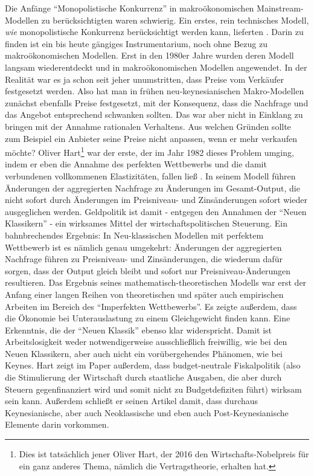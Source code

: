 Die Anfänge "`Monopolistische Konkurrenz"' in makroökonomischen Mainstream-Modellen zu berücksichtigten waren schwierig. Ein erstes, rein technisches Modell, \textit{wie} monopolistische Konkurrenz berücksichtigt werden kann, lieferten \textcite{Dixit1977}. Darin zu finden ist ein bis heute gängiges Instrumentarium, noch ohne Bezug zu makroökonomischen Modellen. Erst in den 1980er Jahre wurden deren Modell langsam wiederentdeckt und in makroökonomischen Modellen angewendet. In der Realität war es ja schon seit jeher unumstritten, dass Preise vom Verkäufer festgesetzt werden. Also hat man in frühen neu-keynesianischen Makro-Modellen \parencite[S. 97]{Hart1982} zunächst ebenfalls Preise festgesetzt, mit der Konsequenz, dass die Nachfrage und das Angebot entsprechend schwanken sollten. Das war aber nicht in Einklang zu bringen mit der Annahme rationalen Verhaltens. Aus welchen Gründen sollte zum Beispiel ein Anbieter seine Preise nicht anpassen, wenn er mehr verkaufen möchte? Oliver Hart\footnote{Dies ist tatsächlich jener Oliver Hart, der 2016 den Wirtschafts-Nobelpreis für ein ganz anderes Thema, nämlich die Vertragstheorie, erhalten hat.} war der erste, der im Jahr 1982 dieses Problem umging, indem er eben die Annahme des perfekten Wettbewerbs und die damit verbundenen vollkommenen Elastizitäten, fallen ließ \parencite[S. 110]{Hart1982}. In seinem Modell führen Änderungen der aggregierten Nachfrage zu Änderungen im Gesamt-Output, die nicht sofort durch Änderungen im Preisniveau- und Zinsänderungen sofort wieder ausgeglichen werden. 
Geldpolitik ist damit - entgegen den Annahmen der "`Neuen Klassikern"' - ein wirksames Mittel der wirtschaftspolitischen Steuerung. Ein bahnbrechendes Ergebnis: In Neu-klassischen Modellen mit perfektem Wettbewerb ist es nämlich genau umgekehrt: Änderungen der aggregierten Nachfrage führen zu Preisniveau- und Zinsänderungen, die wiederum dafür sorgen, dass der Output gleich bleibt und sofort nur Preisniveau-Änderungen resultieren. 
Das Ergebnis seines mathematisch-theoretischen Modells war erst der Anfang einer langen Reihen von theoretischen und später auch empirischen Arbeiten im Bereich des "`Imperfekten Wettbewerbs"'. Es zeigte außerdem, dass die Ökonomie bei Unterauslastung zu einem Gleichgewicht finden kann. Eine Erkenntnis, die der "`Neuen Klassik"' ebenso klar widerspricht.  Damit ist Arbeitslosigkeit weder notwendigerweise ausschließlich freiwillig, wie bei den Neuen Klassikern, aber auch nicht ein vorübergehendes Phänomen, wie bei Keynes. Hart zeigt im Paper außerdem, dass budget-neutrale Fiskalpolitik (also die Stimulierung der Wirtschaft durch staatliche Ausgaben, die aber durch Steuern gegenfinanziert wird und somit nicht zu Budgetdefiziten führt) wirksam sein kann. Außerdem schließt er seinen Artikel damit, dass durchaus Keynesianische, aber auch Neoklassische und eben auch Post-Keynesianische Elemente darin vorkommen. 
